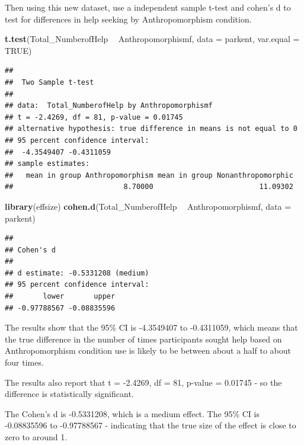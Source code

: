 \documentclass[
]{book}
\newenvironment{Shaded}{\begin{snugshade}}{\end{snugshade}}
\newcommand{\DataTypeTok}[1]{\textcolor[rgb]{0.13,0.29,0.53}{#1}}
\newcommand{\KeywordTok}[1]{\textcolor[rgb]{0.13,0.29,0.53}{\textbf{#1}}}
\newcommand{\NormalTok}[1]{#1}
\newcommand{\OperatorTok}[1]{\textcolor[rgb]{0.81,0.36,0.00}{\textbf{#1}}}
\newcommand{\OtherTok}[1]{\textcolor[rgb]{0.56,0.35,0.01}{#1}}
\newcommand{\StringTok}[1]{\textcolor[rgb]{0.31,0.60,0.02}{#1}}
\begin{document}
Then using this new dataset, use a independent sample t-test and cohen's d to test for differences in help seeking by Anthropomorphism condition.

\begin{Shaded}
\begin{Highlighting}[]
\KeywordTok{t.test}\NormalTok{(Total_NumberofHelp }\OperatorTok{~}\StringTok{ }\NormalTok{Anthropomorphismf, }\DataTypeTok{data =}\NormalTok{ parkent, }\DataTypeTok{var.equal =} \OtherTok{TRUE}\NormalTok{)}
\end{Highlighting}
\end{Shaded}

\begin{verbatim}
## 
##  Two Sample t-test
## 
## data:  Total_NumberofHelp by Anthropomorphismf
## t = -2.4269, df = 81, p-value = 0.01745
## alternative hypothesis: true difference in means is not equal to 0
## 95 percent confidence interval:
##  -4.3549407 -0.4311059
## sample estimates:
##   mean in group Anthropomorphism mean in group Nonanthropomorphic 
##                          8.70000                         11.09302
\end{verbatim}

\begin{Shaded}
\begin{Highlighting}[]
\KeywordTok{library}\NormalTok{(effsize)}
\KeywordTok{cohen.d}\NormalTok{(Total_NumberofHelp }\OperatorTok{~}\StringTok{ }\NormalTok{Anthropomorphismf, }\DataTypeTok{data =}\NormalTok{ parkent)}
\end{Highlighting}
\end{Shaded}

\begin{verbatim}
## 
## Cohen's d
## 
## d estimate: -0.5331208 (medium)
## 95 percent confidence interval:
##       lower       upper 
## -0.97788567 -0.08835596
\end{verbatim}

The results show that the 95\% CI is -4.3549407 to -0.4311059, which means that the true difference in the number of times participants sought help based on Anthropomorphism condition use is likely to be between about a half to about four times.

The results also report that t = -2.4269, df = 81, p-value = 0.01745 - so the difference is statistically significant.

The Cohen's d is -0.5331208, which is a medium effect. The 95\% CI is -0.08835596 to -0.97788567 - indicating that the true size of the effect is close to zero to around 1.
\end{document}
